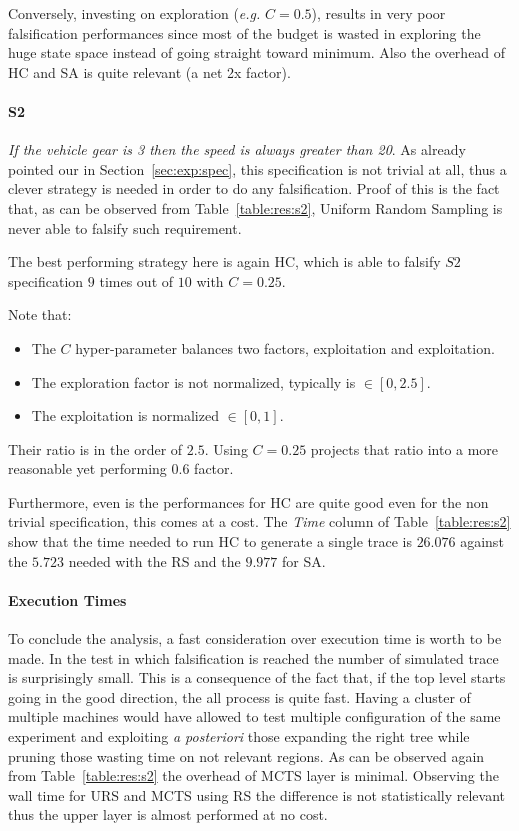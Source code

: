 \documentclass[11pt]{article}
\begin{document}
Conversely, investing on exploration (\textit{e.g.} $C=0.5$), results in very poor falsification performances since most of the budget is wasted in exploring the huge state space instead of going straight toward minimum. Also the overhead of HC and SA is quite relevant (a net 2x factor).

\paragraph{S2} \textit{If the vehicle gear is 3 then the speed is always greater than 20}.
As already pointed our in Section~\ref{sec:exp:spec}, this specification is not trivial at all, thus a clever strategy is needed in order to do any falsification.
Proof of this is the fact that, as can be observed from Table~\ref{table:res:s2}, Uniform Random Sampling is never able to falsify such requirement.

The best performing strategy here is again HC, which is able to falsify $S2$ specification $9$ times out of $10$ with $C=0.25$.

Note that:
\begin{itemize}
    \item The $C$ hyper-parameter balances two factors, exploitation and exploitation.
    \item The exploration factor is not normalized, typically is $\in [0,2.5]$.
    \item The exploitation is normalized $\in [0,1]$.
\end{itemize}
Their ratio is in the order of $2.5$. Using $C=0.25$ projects that ratio into a more reasonable yet performing $0.6$ factor.

Furthermore, even is the performances for HC are quite good even for the non trivial specification, this comes at a cost. The \textit{Time} column of Table~\ref{table:res:s2} show that the time needed to run HC to generate a single trace is $26.076$ against the $5.723$ needed with the RS and the $9.977$ for SA.

\paragraph{Execution Times}
To conclude the analysis, a fast consideration over execution time is worth to be made.
In the test in which falsification is reached the number of simulated trace is surprisingly small. This is a consequence of the fact that, if the top level starts going in the good direction, the all process is quite fast.
Having a cluster of multiple machines would have allowed to test multiple configuration of the same experiment and exploiting \textit{a posteriori} those expanding the right tree while pruning those wasting time on not relevant regions. 
As can be observed again from Table~\ref{table:res:s2} the overhead of MCTS layer is minimal. Observing the wall time for URS and MCTS using RS the difference is not statistically relevant thus the upper layer is almost performed at no cost. 
\end{document}

